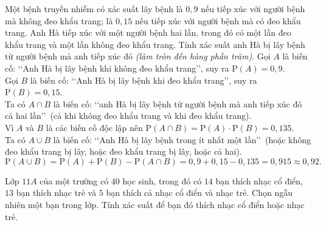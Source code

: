 \begin{bt}%

	Một bệnh truyền nhiễm có xác suất lây bệnh là $0{,}9$ nếu tiếp xúc với người bệnh mà không đeo khẩu trang; là $0{,}15$ nếu tiếp xúc với người bệnh mà có đeo khẩu trang. Anh Hà tiếp xúc với một người bệnh hai lần, trong đó có một lần đeo khẩu trang và một lần không đeo khẩu trang. Tính xác suất anh Hà bị lây bệnh từ người bệnh mà anh tiếp xúc đó \textit{(làm tròn đến hàng phần trăm)}.
	\loigiai
	{
		Gọi $A$ là biến cố: \lq\lq Anh Hà bị lây bệnh khi không đeo khẩu trang\rq\rq, suy ra $\mathrm{P}(A)=0{,}9$.\\
		Gọi $B$ là biến cố: \lq\lq Anh Hà bị lây bệnh khi đeo khẩu trang\rq\rq, suy ra $\mathrm{P}(B)=0{,}15$.\\
		Ta có $A\cap B$ là biến cố: \lq\lq anh Hà bị lây bệnh từ người bệnh mà anh tiếp xúc đó cả hai lần\rq\rq\,  (cả khi không đeo khẩu trang và khi đeo khẩu trang). \\
		Vì $A$ và $B$ là các biến cố độc lập nên $\mathrm{P}(A\cap B)=\mathrm{P}(A)\cdot\mathrm{P}(B)=0{,}135$.\\
		Ta có  $A\cup B$ là biến cố: \lq\lq Anh Hà bị lây bệnh trong ít nhất một lần\rq\rq\, (hoặc không đeo khẩu trang bị lây, hoặc đeo khẩu trang bị lây, hoặc cả hai).
		$$\mathrm{P}(A\cup B)=\mathrm{P}(A)+\mathrm{P}(B) - \mathrm{P}(A\cap B) =0{,}9+0{,}15-0{,}135=0{,}915\approx 0{,}92.$$
	}
\end{bt}

\begin{bt}%
 
	Lớp $11A$ của một trường có $40$ học sinh, trong đó có $14$ bạn thích nhạc cổ điển, $13$ bạn thích nhạc trẻ và $5$ bạn thích cả nhạc cổ điển và nhạc trẻ. Chọn ngẫu nhiên một bạn trong lớp. Tính xác suất để bạn đó thích nhạc cổ điển hoặc nhạc trẻ.
\end{bt}

